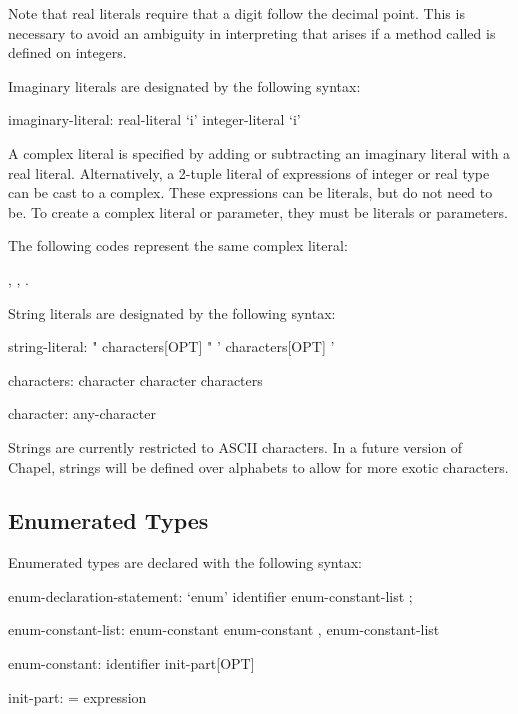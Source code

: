 Note that real literals require that a digit follow the
decimal point.  This is necessary to avoid an ambiguity in
interpreting  that arises if a method called  is
defined on integers.

Imaginary literals are designated by the following syntax:
\begin{syntax}
imaginary-literal:
  real-literal `i'
  integer-literal `i'
\end{syntax}

A complex literal is specified by adding or subtracting an imaginary
literal with a real literal.  Alternatively, a 2-tuple literal of
expressions of integer or real type can be cast to a complex.  These
expressions can be literals, but do not need to be.  To create a
complex literal or parameter, they must be literals or parameters.

\begin{example}
The following codes represent the same complex literal:
\begin{center}
, \hspace{1pc} , \hspace{1pc}
.
\end{center}
\end{example}

String literals are designated by the following syntax:
\begin{syntax}
string-literal:
  " characters[OPT] "
  ' characters[OPT] '

characters:
  character
  character characters

character:
  any-character
\end{syntax}

\begin{status}
Strings are currently restricted to ASCII characters.  In a future
version of Chapel, strings will be defined over alphabets to allow for
more exotic characters.
\end{status}

\subsection{Enumerated Types}
\label{Enumerated_Types}

Enumerated types are declared with the following syntax:
\begin{syntax}
enum-declaration-statement:
  `enum' identifier { enum-constant-list } ;

enum-constant-list:
  enum-constant
  enum-constant , enum-constant-list

enum-constant:
  identifier init-part[OPT]

init-part:
  = expression
\end{syntax}

